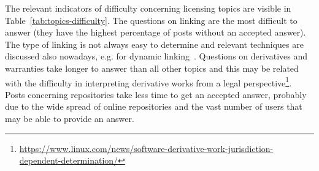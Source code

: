 \documentclass{elsarticle}
\begin{document}
The relevant indicators of difficulty concerning licensing topics are visible in Table~\ref{tab:topics-difficulty}. The questions on linking are the most difficult to answer (they have the highest percentage of posts without an accepted answer). The type of linking is not always easy to determine and relevant techniques are discussed also nowadays, e.g. for dynamic linking~\cite{gerbarg2020techniques}. Questions on derivatives and warranties take longer to answer than all other topics and this may be related with the difficulty in interpreting derivative works from a legal perspective\footnote{\url{https://www.linux.com/news/software-derivative-work-jurisdiction-dependent-determination/}}. Posts concerning repositories take less time to get an accepted answer, probably due to the wide spread of online repositories and the vast number of users that may be able to provide an answer. 
\end{document}

